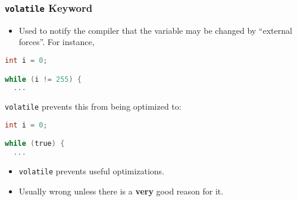 \begin{frame}[fragile]
  \frametitle{{\tt volatile} Keyword}


  \begin{itemize}
    \item Used to notify the compiler that the variable may be changed by ``external forces''. For instance,
  \end{itemize}

  \begin{lstlisting}[language=C]
int i = 0;

while (i != 255) {
  ...
  \end{lstlisting}

{\tt volatile} prevents this from being optimized to:

  \begin{lstlisting}[language=C]
int i = 0;

while (true) {
  ...
  \end{lstlisting}

  \begin{itemize}
    \item {\tt volatile} prevents useful optimizations.
    \item Usually wrong unless there is a {\bf very} good reason for it.
  \end{itemize}


\end{frame}




